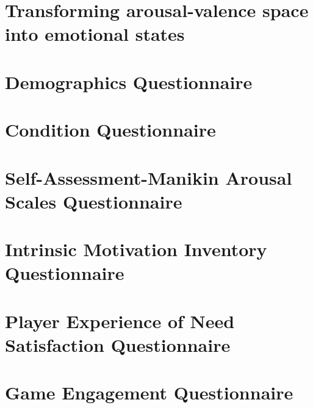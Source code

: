 \documentclass{uofsthesis-cs}
\begin{document}
\chapter{Transforming arousal-valence space into emotional states}        \label{app:av-to-emotion} 
\chapter{Demographics Questionnaire}                                      \label{app:q-dmg}         
\chapter{Condition Questionnaire}                                         \label{app:q-cnd}         
\chapter{Self-Assessment-Manikin Arousal Scales Questionnaire}            \label{app:q-sam}         
\chapter{Intrinsic Motivation Inventory Questionnaire}                    \label{app:q-ini}         
\chapter{Player Experience of Need Satisfaction Questionnaire}            \label{app:q-pens}        
\chapter{Game Engagement Questionnaire}                                   \label{app:q-geq}         

\end{document}
